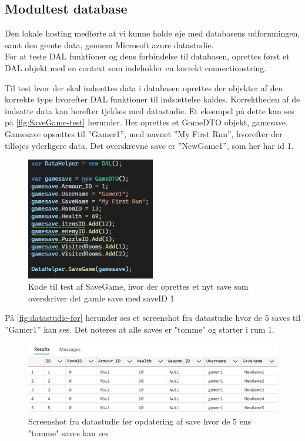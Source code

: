 \subsection{Modultest database}
\label{ssec: Modultest database}
Den lokale hosting medførte at vi kunne holde øje med databasens udformningen, samt den gemte data, gennem Microsoft azure datastudie.\\

\noindent For at teste DAL funktioner og dens forbindelse til databasen, oprettes først et DAL objekt med en context som indeholder en korrekt connectionstring.

\noindent Til test hvor der skal indsættes data i databasen oprettes der objekter af den korrekte type hvorefter DAL funktioner til indsættelse kaldes. Korrektheden af de indsatte data kan herefter tjekkes med datastudie.
Et eksempel på dette kan ses på \autoref{fig:SaveGame-test} herunder.
Her oprettes et GameDTO objekt, gamesave.\\
Gamesave opsættes til ”Gamer1”, med navnet ”My First Run”, hvorefter der tilføjes yderligere data. Det overskrevne save er ”NewGame1”, som her har id 1.

\begin{figure}[H]
\centering
\includegraphics[width = 0.5\textwidth]{02-Body/Images/DAL-Database/DB-Test.png}
\caption{Kode til test af SaveGame, hvor der oprettes et nyt save som overskriver det gamle save med saveID 1}
\label{fig:SaveGame-test}
\end{figure}

\noindent På \autoref{fig:datastudie-før} herunder ses et screenshot fra datastudie hvor de 5 saves til ”Gamer1” kan ses.
Det noteres at alle saves er "tomme" og starter i rum 1.

\begin{figure}[H]
\centering
\includegraphics[width = \textwidth]{02-Body/Images/DAL-Database/DatastudieFørIndsættelse.png}
\caption{Screenshot fra datastudie før opdatering af save hvor de 5 ens "tomme" saves kan ses}
\label{fig:datastudie-før}
\end{figure}

